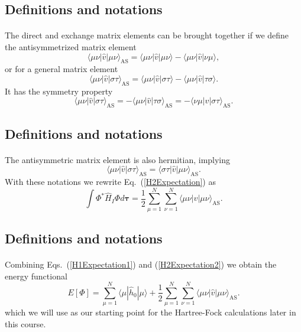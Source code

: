 \documentclass[%
twoside,                 %
final,                   %
10pt]{article}
\begin{document}
\subsection{Definitions and notations}

\paragraph{}
The direct and exchange matrix elements can be  brought together if we define the antisymmetrized matrix element
\[
\langle \mu\nu|\hat{v}|\mu\nu\rangle_{\mathrm{AS}}= \langle \mu\nu|\hat{v}|\mu\nu\rangle-\langle \mu\nu|\hat{v}|\nu\mu\rangle,
\]
or for a general matrix element  
\[
\langle \mu\nu|\hat{v}|\sigma\tau\rangle_{\mathrm{AS}}= \langle \mu\nu|\hat{v}|\sigma\tau\rangle-\langle \mu\nu|\hat{v}|\tau\sigma\rangle.
\]
It has the symmetry property
\[
\langle \mu\nu|\hat{v}|\sigma\tau\rangle_{\mathrm{AS}}= -\langle \mu\nu|\hat{v}|\tau\sigma\rangle_{\mathrm{AS}}=-\langle \nu\mu|\hat{v}|\sigma\tau\rangle_{\mathrm{AS}}.
\]




\subsection{Definitions and notations}

\paragraph{}
The antisymmetric matrix element is also hermitian, implying 
\[
\langle \mu\nu|\hat{v}|\sigma\tau\rangle_{\mathrm{AS}}= \langle \sigma\tau|\hat{v}|\mu\nu\rangle_{\mathrm{AS}}.
\]
With these notations we rewrite Eq.~(\ref{H2Expectation}) as 
\begin{equation}
  \int \Phi^*\hat{H}_I\Phi d\mathbf{\tau} 
  = \frac{1}{2}\sum_{\mu=1}^N\sum_{\nu=1}^N \langle \mu\nu|\hat{v}|\mu\nu\rangle_{\mathrm{AS}}.
\label{H2Expectation2}
\end{equation}



\subsection{Definitions and notations}

\paragraph{}
Combining Eqs.~(\ref{H1Expectation1}) and
(\ref{H2Expectation2}) we obtain the energy functional 
\begin{equation}
  E[\Phi] 
  = \sum_{\mu=1}^N \langle \mu | \hat{h}_0 | \mu \rangle +
  \frac{1}{2}\sum_{{\mu}=1}^N\sum_{{\nu}=1}^N \langle \mu\nu|\hat{v}|\mu\nu\rangle_{\mathrm{AS}}.
\label{FunctionalEPhi}
\end{equation}
which we will use as our starting point for the Hartree-Fock calculations later in this course.








\printindex
\end{document}

